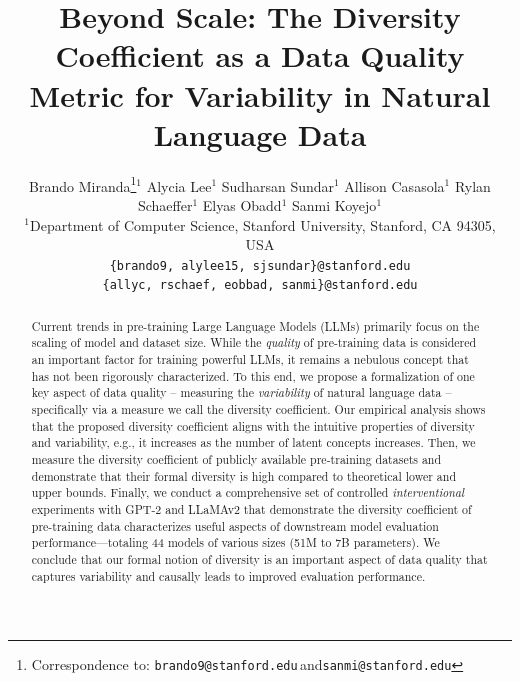 \documentclass[10pt]{article}
\title{Beyond Scale: The Diversity Coefficient as a Data Quality Metric for Variability in Natural Language Data}
\author{%
Brando Miranda\thanks{Correspondence to: \texttt{brando9@stanford.edu}\,\;and\;\texttt{sanmi@stanford.edu}}\space\space$^{1}$
\And
Alycia Lee$^{1}$
\And
Sudharsan Sundar$^{1}$
\AND
Allison Casasola$^{1}$
\And
Rylan Schaeffer$^{1}$
\And
Elyas Obadd$^{1}$
\AND
Sanmi Koyejo$^{1}$
\\[0.8em]
$^{1}$Department of Computer Science, Stanford University, Stanford, CA 94305, USA\\
\texttt{\{brando9, alylee15, sjsundar\}@stanford.edu}\\
\texttt{\{allyc, rschaef, eobbad, sanmi\}@stanford.edu}
}
\begin{document}
\maketitle

\begin{abstract}
Current trends in pre-training Large Language Models (LLMs) primarily focus on the scaling of model and dataset size.
While the \textit{quality} of pre-training data is considered an important factor for training powerful LLMs, it remains a nebulous concept that has not been rigorously characterized.
To this end, we propose a formalization of one key aspect of data quality -- measuring the \textit{variability} of natural language data -- specifically via a measure we call the diversity coefficient.
Our empirical analysis shows that the proposed diversity coefficient aligns with the intuitive properties of diversity and variability,
e.g., it increases as the number of latent concepts increases.
Then, we measure the diversity coefficient of publicly available pre-training datasets and demonstrate that their formal diversity is high compared to theoretical lower and upper bounds.
Finally, we conduct a comprehensive set of controlled \textit{interventional} experiments with GPT-2 and LLaMAv2 that demonstrate the diversity coefficient of pre-training data characterizes useful aspects of downstream model evaluation performance---totaling 44 models of various sizes (51M to 7B parameters).
We conclude that our formal notion of diversity is an important aspect of data quality that captures variability and causally leads to improved evaluation performance.
\end{abstract}

\let\AND\undefined










\end{document}
